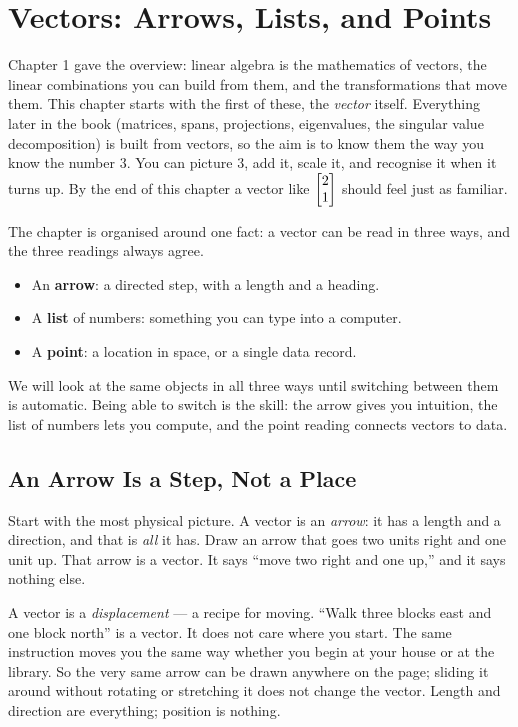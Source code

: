 \chapter{Vectors: Arrows, Lists, and Points}

Chapter 1 gave the overview: linear algebra is the mathematics of vectors, the linear
combinations you can build from them, and the transformations that move them. This
chapter starts with the first of these, the \emph{vector} itself. Everything later in the
book (matrices, spans, projections, eigenvalues, the singular value decomposition) is
built from vectors, so the aim is to know them the way you know the number $3$. You can
picture $3$, add it, scale it, and recognise it when it turns up. By the end of this
chapter a vector like $\begin{bmatrix}2 \\ 1\end{bmatrix}$ should feel just as familiar.

The chapter is organised around one fact: a vector can be read in three ways, and the
three readings always agree.

\begin{itemize}
  \item An \textbf{arrow}: a directed step, with a length and a heading.
  \item A \textbf{list} of numbers: something you can type into a computer.
  \item A \textbf{point}: a location in space, or a single data record.
\end{itemize}

We will look at the same objects in all three ways until switching between them is
automatic. Being able to switch is the skill: the arrow gives you intuition, the list of
numbers lets you compute, and the point reading connects vectors to data.

\section{An Arrow Is a Step, Not a Place}
\label{ch02:arrow}

Start with the most physical picture. A vector is an \emph{arrow}: it has a length and a
direction, and that is \emph{all} it has. Draw an arrow that goes two units right and
one unit up. That arrow is a vector. It says ``move two right and one up,'' and it says
nothing else.

\begin{intuitionbox}
A vector is a \emph{displacement} --- a recipe for moving. ``Walk three blocks east and
one block north'' is a vector. It does not care where you start. The same instruction
moves you the same way whether you begin at your house or at the library. So the very
same arrow can be drawn anywhere on the page; sliding it around without rotating or
stretching it does not change the vector. Length and direction are everything; position
is nothing.
\end{intuitionbox}

